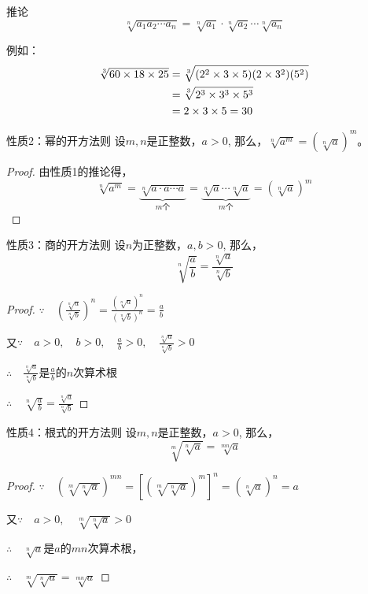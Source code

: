 \begin{blk}{推论}
\[\sqrt[n]{a_1a_2\cdots a_n}=\sqrt[n]{a_1}\cdot \sqrt[n]{a_2}\cdots \sqrt[n]{a_n}\]
\end{blk}

例如：\[\begin{split}
    \sqrt[3]{60\times 18\times 25}&=\sqrt[3]{(2^2\times 3\times 5)(2\times 3^2)(5^2)}\\
    &=\sqrt[3]{2^3\times 3^3\times 5^3}\\
    &=2\times 3\times 5=30
\end{split}\]

\begin{blk}{性质2：幂的开方法则}
设$m,n$是正整数，$a>0$, 那么，$\sqrt[n]{a^m}=\left(\sqrt[n]{a}\right)^m$。

\end{blk}

\begin{proof}
由性质1的推论得，
\[\sqrt[n]{a^m}=\underbrace{\sqrt[n]{a\cdot a\cdots a}}_{\text{$m$个}}=\underbrace{\sqrt[n]{a}\cdots \sqrt[n]{a}}_{\text{$m$个}}=\left(\sqrt[n]{a}\right)^m\]
\end{proof}

\begin{blk}{性质3：商的开方法则}
    设$n$为正整数，$a,b>0$, 那么，
\[\sqrt[n]{\frac{a}{b}}=\frac{\sqrt[n]{a}}{\sqrt[n]{b}}\] 
\end{blk}

\begin{proof}
$\because\quad \left(\frac{\sqrt[n]{a}}{\sqrt[n]{b}}\right)^n=\frac{\left(\sqrt[n]{a}\right)^n}{\left(\sqrt[n]{b}\right)^n}=\frac{a}{b}$

又$\because\quad a>0,\quad   b>0,\quad \frac{a}{b}>0,\quad \frac{\sqrt[n]{a}}{\sqrt[n]{b}}>0$

$\therefore\quad \frac{\sqrt[n]{a}}{\sqrt[n]{b}}$是$\frac{a}{b}$的$n$次算术根

$\therefore\quad \sqrt[n]{\frac{a}{b}}=\frac{\sqrt[n]{a}}{\sqrt[n]{b}}$

\end{proof}

\begin{blk}{性质4：根式的开方法则}
    设$m,n$是正整数，$a>0$, 那么，
\[\sqrt[m]{\sqrt[n]{a}}=\sqrt[mn]{a}\]
\end{blk}

\begin{proof}
    $\because\quad \left(\sqrt[m]{\sqrt[n]{a}}\right)^{mn}=\left[\left(\sqrt[m]{\sqrt[n]{a}}\right)^m\right]^n=\left(\sqrt[n]{a}\right)^n=a$

    又$\because\quad a>0,\quad \sqrt[m]{\sqrt[n]{a}}>0 $
    
    $\therefore\quad \sqrt[n]{a}$是$a$的$mn$次算术根，

    $\therefore\quad \sqrt[m]{\sqrt[n]{a}}=\sqrt[mn]{a}$
\end{proof}


